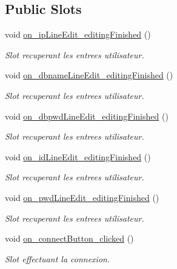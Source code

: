 \subsection*{Public Slots}
\begin{DoxyCompactItemize}
\item 
void \mbox{\hyperlink{classMainWindow_af61dc400b82ca1d28bab9fb4ee377528}{on\+\_\+ip\+Line\+Edit\+\_\+editing\+Finished}} ()
\begin{DoxyCompactList}\small\item\em Slot recuperant les entrees utilisateur. \end{DoxyCompactList}\item 
void \mbox{\hyperlink{classMainWindow_a4ad002ada4f696aed5badc4728590eea}{on\+\_\+dbname\+Line\+Edit\+\_\+editing\+Finished}} ()
\begin{DoxyCompactList}\small\item\em Slot recuperant les entrees utilisateur. \end{DoxyCompactList}\item 
void \mbox{\hyperlink{classMainWindow_aefd7e7d3ddd36d873d0c972b9d89d0a3}{on\+\_\+dbpwd\+Line\+Edit\+\_\+editing\+Finished}} ()
\begin{DoxyCompactList}\small\item\em Slot recuperant les entrees utilisateur. \end{DoxyCompactList}\item 
void \mbox{\hyperlink{classMainWindow_a33cdc4c422744bb769a725c28b7667d0}{on\+\_\+id\+Line\+Edit\+\_\+editing\+Finished}} ()
\begin{DoxyCompactList}\small\item\em Slot recuperant les entrees utilisateur. \end{DoxyCompactList}\item 
void \mbox{\hyperlink{classMainWindow_a1a1846c640e2e6e208455a85f2c47a04}{on\+\_\+pwd\+Line\+Edit\+\_\+editing\+Finished}} ()
\begin{DoxyCompactList}\small\item\em Slot recuperant les entrees utilisateur. \end{DoxyCompactList}\item 
void \mbox{\hyperlink{classMainWindow_a55cd52e7b00aff669290588f8affea5a}{on\+\_\+connect\+Button\+\_\+clicked}} ()
\begin{DoxyCompactList}\small\item\em Slot effectuant la connexion. \end{DoxyCompactList}\end{DoxyCompactItemize}
